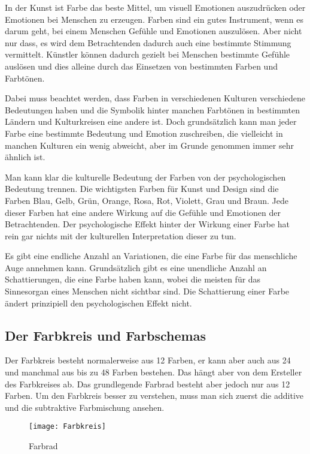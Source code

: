 In der Kunst ist Farbe das beste Mittel, um visuell Emotionen auszudrücken oder Emotionen bei Menschen zu erzeugen. Farben sind ein gutes Instrument, wenn es darum geht, bei einem Menschen Gefühle und Emotionen auszulösen. Aber nicht nur dass, es wird dem Betrachtenden dadurch auch eine bestimmte Stimmung vermittelt. Künstler können dadurch gezielt bei Menschen bestimmte Gefühle auslösen und dies alleine durch das Einsetzen von bestimmten Farben und Farbtönen.\cite{_special_subjects} 

Dabei muss beachtet werden, dass Farben in verschiedenen Kulturen verschiedene Bedeutungen haben und die Symbolik hinter manchen Farbtönen in bestimmten Ländern und Kulturkreisen eine andere ist. Doch grundsätzlich kann man jeder Farbe eine bestimmte Bedeutung und Emotion zuschreiben, die vielleicht in manchen Kulturen ein wenig abweicht, aber im Grunde genommen immer sehr ähnlich ist.\cite{_special_subjects}

Man kann klar die kulturelle Bedeutung der Farben von der psychologischen Bedeutung trennen. Die wichtigsten Farben für Kunst und Design sind die Farben Blau, Gelb, Grün, Orange, Rosa, Rot, Violett, Grau und Braun. Jede dieser Farben hat eine andere Wirkung auf die Gefühle und Emotionen der Betrachtenden. Der psychologische Effekt hinter der Wirkung einer Farbe hat rein gar nichts mit der kulturellen Interpretation dieser zu tun. 
 \cite{_special_subjects}
 
Es gibt eine endliche Anzahl an Variationen, die eine Farbe für das menschliche Auge annehmen kann. Grundsätzlich gibt es eine unendliche Anzahl an Schattierungen, die eine Farbe haben kann, wobei die meisten für das Sinnesorgan eines Menschen nicht sichtbar sind. Die Schattierung einer Farbe ändert prinzipiell den psychologischen Effekt nicht.
\cite{_special_subjects}

\subsection{Der Farbkreis und Farbschemas}
Der Farbkreis besteht normalerweise aus 12 Farben, er kann aber auch aus 24 und manchmal aus bis zu 48 Farben bestehen. Das hängt aber von dem Ersteller des Farbkreises ab. Das grundlegende Farbrad besteht aber jedoch nur aus 12 Farben. Um den Farbkreis besser zu verstehen, muss man sich zuerst die additive und die subtraktive Farbmischung ansehen.  
\cite{_special_subjects}

\begin{figure}[H]
	\centering
	\texttt{[image: Farbkreis]}
	\caption{Farbrad\cite{_basicColorTheory}}
\end{figure}

